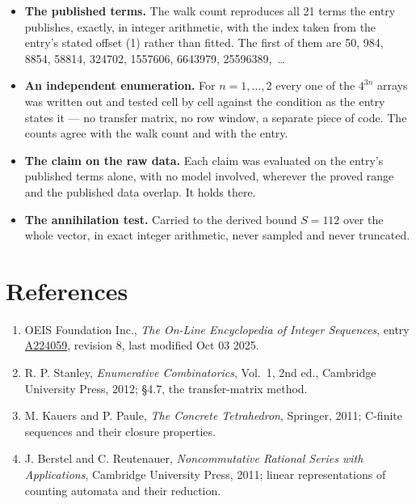 \documentclass[11pt]{article}
\theoremstyle{definition}
\begin{document}
\begin{itemize}

\item {\bfseries The published terms.} The walk count reproduces all 21 terms the entry publishes, exactly, in integer arithmetic, with the index taken from the entry's stated offset (1) rather than fitted. The first of them are 50, 984, 8854, 58814, 324702, 1557606, 6643979, 25596389,~\dots

\item {\bfseries An independent enumeration.} For $n = 1,\dots,2$ every one of the $4^{3n}$ arrays was written out and tested cell by cell against the condition as the entry states it --- no transfer matrix, no row window, a separate piece of code. The counts agree with the walk count and with the entry.

\item {\bfseries The claim on the raw data.} Each claim was evaluated on the entry's published terms alone, with no model involved, wherever the proved range and the published data overlap. It holds there.

\item {\bfseries The annihilation test.} Carried to the derived bound $S = 112$ over the whole vector, in exact integer arithmetic, never sampled and never truncated.

\end{itemize}

\section{References}

\begin{enumerate}

\item OEIS Foundation Inc., \emph{The On-Line Encyclopedia of Integer Sequences}, entry \href{https://oeis.org/A224059}{A224059}, revision 8, last modified Oct 03 2025.

\item R. P. Stanley, \emph{Enumerative Combinatorics}, Vol.~1, 2nd ed., Cambridge University Press, 2012; \S4.7, the transfer-matrix method.

\item M. Kauers and P. Paule, \emph{The Concrete Tetrahedron}, Springer, 2011; C-finite sequences and their closure properties.

\item J. Berstel and C. Reutenauer, \emph{Noncommutative Rational Series with Applications}, Cambridge University Press, 2011; linear representations of counting automata and their reduction.

\end{enumerate}
\end{document}
